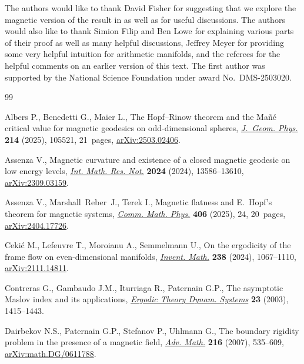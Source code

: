 \documentclass[pdftex]{sigma}
\numberwithin{equation}{section}
\theoremstyle{definition}
\begin{document}
The authors would like to thank David Fisher for suggesting that we explore the magnetic version of the result in \cite{filip2024finiteness} as well as for useful discussions. The authors would also like to thank Simion Filip and Ben Lowe for explaining various parts of their proof as well as many helpful discussions, Jeffrey Meyer for providing some very helpful intuition for arithmetic manifolds, and the referees for the helpful comments on an earlier version of this text. The first author was supported by the National Science Foundation under award No.\ DMS-2503020.

\begin{thebibliography}{99}
\footnotesize\itemsep=0pt

Albers P., Benedetti G., Maier L., The {H}opf--{R}inow theorem and the
 {M}a\~{n}\'{e} critical value for magnetic geodesics on odd-dimensional
 spheres,
 \href{https://doi.org/10.1016/j.geomphys.2025.105521}{\textit{J.~Geom.
 Phys.}} \textbf{214} (2025), 105521, 21~pages,
 \href{http://arxiv.org/abs/2503.02406}{arXiv:2503.02406}.

Assenza V., Magnetic curvature and existence of a closed magnetic geodesic on
 low energy levels, \href{https://doi.org/10.1093/imrn/rnae209}{\textit{Int.
 Math. Res. Not.}} \textbf{2024} (2024), 13586--13610,
 \href{http://arxiv.org/abs/2309.03159}{arXiv:2309.03159}.

Assenza V., Marshall~Reber~J., Terek I., Magnetic flatness and {E}.~{H}opf's theorem
 for magnetic systems,
 \href{https://doi.org/10.1007/s00220-024-05166-5}{\textit{Comm. Math. Phys.}}
 \textbf{406} (2025), 24, 20~pages,
 \href{http://arxiv.org/abs/2404.17726}{arXiv:2404.17726}.

Ceki\'{c} M., Lefeuvre T., Moroianu A., Semmelmann U., On the ergodicity of the
 frame flow on even-dimensional manifolds,
 \href{https://doi.org/10.1007/s00222-024-01297-7}{\textit{Invent. Math.}}
 \textbf{238} (2024), 1067--1110,
 \href{http://arxiv.org/abs/2111.14811}{arXiv:2111.14811}.

Contreras G., Gambaudo J.M., Iturriaga R., Paternain G.P., The asymptotic
 {M}aslov index and its applications,
 \href{https://doi.org/10.1017/S0143385703000063}{\textit{Ergodic Theory
 Dynam. Systems}} \textbf{23} (2003), 1415--1443.

Dairbekov N.S., Paternain G.P., Stefanov P., Uhlmann G., The boundary rigidity
 problem in the presence of a magnetic field,
 \href{https://doi.org/10.1016/j.aim.2007.05.014}{\textit{Adv. Math.}}
 \textbf{216} (2007), 535--609,
 \href{http://arxiv.org/abs/math.DG/0611788}{arXiv:math.DG/0611788}.


\end{thebibliography}
\end{document}

